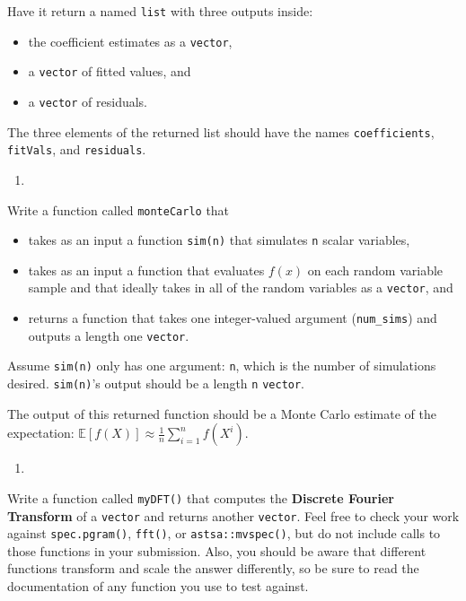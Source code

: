 \documentclass[12pt,krantz2]{krantz}
\providecommand{\tightlist}{%
  \setlength{\itemsep}{0pt}\setlength{\parskip}{0pt}}
\begin{document}
Have it return a named \texttt{list} with three outputs inside:

\begin{itemize}
\tightlist
\item
  the coefficient estimates as a \texttt{vector},
\item
  a \texttt{vector} of fitted values, and
\item
  a \texttt{vector} of residuals.
\end{itemize}

The three elements of the returned list should have the names \texttt{coefficients}, \texttt{fitVals}, and \texttt{residuals}.

\begin{enumerate}
\def\labelenumi{\arabic{enumi}.}
\setcounter{enumi}{1}
\item
\end{enumerate}

Write a function called \texttt{monteCarlo} that

\begin{itemize}
\tightlist
\item
  takes as an input a function \texttt{sim(n)} that simulates \texttt{n} scalar variables,\\
\item
  takes as an input a function that evaluates \(f(x)\) on each random variable sample and that ideally takes in all of the random variables as a \texttt{vector}, and
\item
  returns a function that takes one integer-valued argument (\texttt{num\_sims}) and outputs a length one \texttt{vector}.
\end{itemize}

Assume \texttt{sim(n)} only has one argument: \texttt{n}, which is the number of simulations desired. \texttt{sim(n)}'s output should be a length \texttt{n} \texttt{vector}.

The output of this returned function should be a Monte Carlo estimate of the expectation: \(\mathbb{E}[f(X)] \approx \frac{1}{n}\sum_{i=1}^n f(X^i)\).

\begin{enumerate}
\def\labelenumi{\arabic{enumi}.}
\setcounter{enumi}{2}
\item
\end{enumerate}

Write a function called \texttt{myDFT()} that computes the \textbf{Discrete Fourier Transform} of a \texttt{vector} and returns another \texttt{vector}. Feel free to check your work against \texttt{spec.pgram()}, \texttt{fft()}, or \texttt{astsa::mvspec()}, but do not include calls to those functions in your submission. Also, you should be aware that different functions transform and scale the answer differently, so be sure to read the documentation of any function you use to test against.
\end{document}

